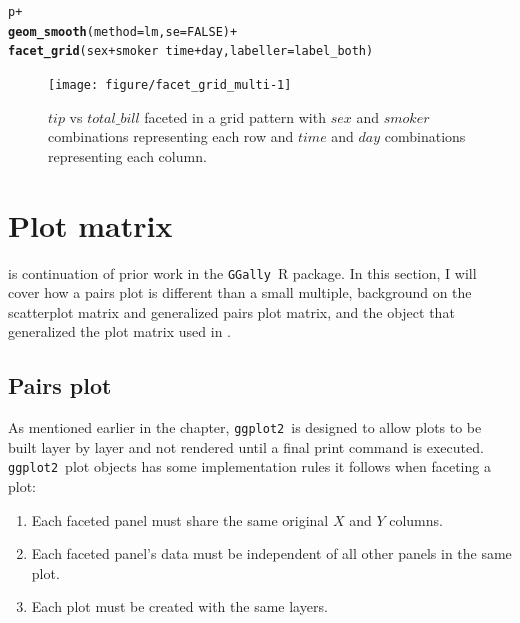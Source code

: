 \documentclass[stat,dissertation]{puthesis}\usepackage[]{graphicx}\usepackage{xcolor}
\makeatletter
\newcommand{\hlnum}[1]{\textcolor[rgb]{0.686,0.059,0.569}{#1}}%
\newcommand{\hlopt}[1]{\textcolor[rgb]{0,0,0}{#1}}%
\newcommand{\hlstd}[1]{\textcolor[rgb]{0.345,0.345,0.345}{#1}}%
\newcommand{\hlkwc}[1]{\textcolor[rgb]{0.333,0.667,0.333}{#1}}%
\newcommand{\hlkwd}[1]{\textcolor[rgb]{0.737,0.353,0.396}{\textbf{#1}}}%
\newenvironment{kframe}{%
 \def\at@end@of@kframe{}%
 \ifinner\ifhmode%
  \def\at@end@of@kframe{\end{minipage}}%
  \begin{minipage}{\columnwidth}%
 \fi\fi%
 \def\FrameCommand##1{\hskip\@totalleftmargin \hskip-\fboxsep
 \colorbox{shadecolor}{##1}\hskip-\fboxsep
     \hskip-\linewidth \hskip-\@totalleftmargin \hskip\columnwidth}%
 \MakeFramed {\advance\hsize-\width
   \@totalleftmargin\z@ \linewidth\hsize
   \@setminipage}}%
 {\par\unskip\endMakeFramed%
 \at@end@of@kframe}
\newenvironment{knitrout}{}{} %
\renewenvironment{knitrout}{\setstretch{1}}{}
\newcommand{\pkg}[1]{\texttt{#1}}
\newcommand{\ggplot}{\pkg{ggplot2}}
\newcommand{\GGally}{\pkg{GGally}}
\makeatother
\begin{document}
\newpage
\begin{knitrout}\small
{}\color{fgcolor}\begin{kframe}
\begin{alltt}
\hlstd{p} \hlopt{+}
  \hlkwd{geom_smooth}\hlstd{(}\hlkwc{method} \hlstd{= lm,} \hlkwc{se} \hlstd{=} \hlnum{FALSE}\hlstd{)} \hlopt{+}
  \hlkwd{facet_grid}\hlstd{(sex} \hlopt{+} \hlstd{smoker} \hlopt{~} \hlstd{time} \hlopt{+} \hlstd{day,} \hlkwc{labeller} \hlstd{= label_both)}
\end{alltt}
\end{kframe}\begin{figure}[H]

{\centering \texttt{[image: figure/facet\_grid\_multi-1]} 

}

\caption{$tip$ vs $total\_bill$ faceted in a grid pattern with $sex$ and $smoker$ combinations representing each row and $time$ and $day$ combinations representing each column.}\label{fig:facet_grid_multi}
\end{figure}


\end{knitrout}



\section{Plot matrix}

 is continuation of prior work in the \GGally~R package.  In this section, I will cover how a pairs plot is different than a small multiple, background on the scatterplot matrix and generalized pairs plot matrix, and the  object that generalized the plot matrix used in .


\subsection{Pairs plot}

  As mentioned earlier in the chapter, \ggplot~is designed to allow plots to be built layer by layer and not rendered until a final print command is executed.  \ggplot~plot objects has some implementation rules it follows when faceting a plot:

  \begin{enumerate}
    \item Each faceted panel must share the same original $X$ and $Y$ columns.
    \item Each faceted panel's data must be independent of all other panels in the same plot.
    \item Each plot must be created with the same layers.
  \end{enumerate}
\end{document}

